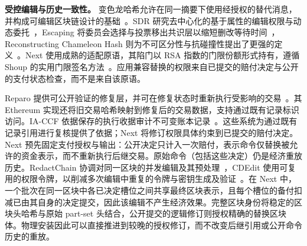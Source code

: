 \noindent\textbf{受控编辑与历史一致性。}
变色龙哈希允许在同一摘要下使用经授权的替代消息，并构成可编辑区块链设计的基础~\cite{redactable}。SDR 研究去中心化的基于属性的编辑权限与动态委托~\cite{sdr}，Escaping 将委员会选择与投票移出共识层以缩短删改等待时间~\cite{escaping}，Reconstructing Chameleon Hash 则为不可区分性与抗碰撞性提出了更强的定义~\cite{reconstructCH}。Next 使用成熟的适配原语，其陷门以 RSA 指数的门限份额形式持有，遵循 Shoup 的实用门限签名方法~\cite{shoup}。应用兼容替换的权限来自已提交的赔付决定与公开的支付状态检查，而不是来自该原语。

Reparo 提供可公开验证的修复层，并可在修复状态时重新执行受影响的交易~\cite{reparo}。其 Ethereum 实现还将旧交易哈希映射到修复后的交易数据，支持通过既有记录标识访问。IA-CCF 依据保存的执行收据审计不可变账本记录~\cite{ia-ccf}。这些系统为通过既有记录引用进行复核提供了依据；Next 将修订权限具体约束到已提交的赔付决定。Next 预先固定支付授权与输出：公开决定只计入一次赔付，表示命令仅替换被允许的资金表示，而不重新执行后继交易。原始命令（包括这些决定）仍是经济重放历史。RedactChain 协调对同一区块的并发编辑及其预处理~\cite{redactchain}，CDEdit 使用可复用的权限令牌，以削减多次编辑中重复的令牌与密钥生成及验证~\cite{cdedit}。在 Next 中，一个批次在同一区块中各已决定槽位之间共享最终区块表示，且每个槽位的备付扣减已由其自身的决定提交，因此该编辑不产生经济效果。完整区块身份将稳定的区块头哈希与原始 part-set 头结合，公开提交的逻辑修订则授权精确的替换区块体。物理安装因此可以直接推进到较晚的授权修订，而不改变后继引用或公开命令历史的重放。

